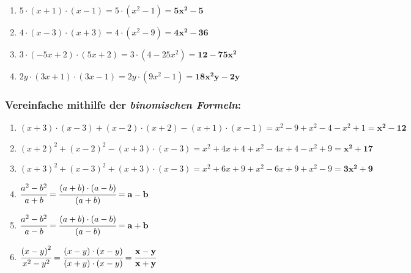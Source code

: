 \documentclass[a4paper,10pt]{article} %
\begin{document}
\begin{enumerate}[label=\alph*)]

  \item \(5 \cdot (x + 1) \cdot (x - 1) =
    5 \cdot (x^2 - 1) =
    \mathbf{5x^2 - 5}\) %

  \item \(4 \cdot (x - 3) \cdot (x + 3) =
    4 \cdot (x^2 - 9) =
    \mathbf{4x^2 - 36}\) %

  \item \(3 \cdot (-5x + 2) \cdot (5x + 2) =
    3 \cdot (4 - 25x^2) =
    \mathbf{12 - 75x^2}\) %

  \item \(2y \cdot (3x + 1) \cdot (3x - 1) =
    2y \cdot (9x^2 - 1) =
    \mathbf{18x^2y - 2y}\) %

\end{enumerate}

\subsubsection{Vereinfache mithilfe der \textit{binomischen Formeln}:} %

\begin{enumerate}[label=\alph*)]

  \item \((x + 3) \cdot (x - 3) + (x - 2) \cdot (x + 2) - (x + 1) \cdot (x - 1) =
    x^2 - 9 + x^2 - 4 - x^2 + 1 =
    \mathbf{x^2 - 12}\) %

  \item \({(x + 2)}^2 + {(x - 2)}^2 - (x + 3) \cdot (x - 3) =
    x^2 + 4x + 4 + x^2 - 4x + 4 - x^2 + 9 =
    \mathbf{x^2 + 17}\) %

  \item \({(x + 3)}^2 + {(x - 3)}^2 + (x + 3) \cdot (x - 3) =
    x^2 + 6x + 9 + x^2 - 6x + 9 + x^2 - 9 =
    \mathbf{3x^2 + 9}\) %

  \item \(\cfrac{a^2 - b^2}{a + b} =
    \cfrac{(a + b) \cdot (a - b)}{(a + b)} =
    \mathbf{a - b}\) %

  \item \(\cfrac{a^2 - b^2}{a - b} =
    \cfrac{(a + b) \cdot (a - b)}{(a - b)} =
    \mathbf{a + b}\) %

  \item \(\cfrac{{(x - y)}^2}{x^2 - y^2} =
    \cfrac{(x - y) \cdot (x - y)}{(x + y) \cdot (x - y)} =
    \mathbf{\cfrac{x - y}{x + y}}\) %

\end{enumerate}
\end{document}
